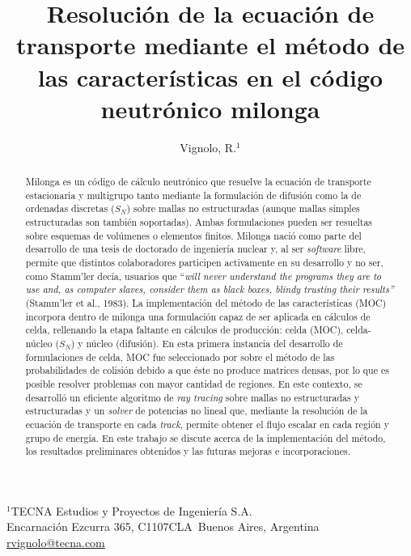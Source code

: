 \documentclass[11pt]{article}
\makeatletter
\def\affiliation#1{\def\@affiliation{#1}}
\def\maketitle{%
\thispagestyle{empty}

\null
\vspace{0.5cm plus 0.5cm minus 0.5cm}

\begin{center}
\begin{minipage}{0.8\linewidth}
\begin{center}
\Large{\textbf{\textsc{\@title}}}

\vspace{0.75cm plus 0.2cm minus 0.1cm}

\large{\@author}

\vspace{1.25cm plus 0.25cm minus 0.25cm}

\small{\@affiliation}
\vspace{1cm plus 0.2cm minus 0.2cm}

\end{center}
\end{minipage}
\end{center}

}
\makeatother
\begin{document}
\title{Resolución de la ecuación de transporte mediante el método de las características en el código neutrónico milonga}
\author{Vignolo, R.$^{1}$}
\affiliation{%
$^1$TECNA Estudios y Proyectos de Ingeniería S.A.\\
Encarnaci\'on Ezcurra 365, C1107CLA~Buenos Aires, Argentina\\
\url{rvignolo@tecna.com}\\
}


\maketitle


\begin{abstract}
\noindent
Milonga es un código de cálculo neutrónico que resuelve la ecuación de transporte estacionaria y multigrupo tanto mediante la formulación de difusión como la de ordenadas discretas ($S_N$) sobre mallas no estructuradas (aunque mallas simples estructuradas son también soportadas). Ambas formulaciones pueden ser resueltas sobre esquemas de volúmenes o elementos finitos. Milonga nació como parte del desarrollo de una tesis de doctorado de ingeniería nuclear y, al ser \emph{software} libre, permite que distintos colaboradores participen activamente en su desarrollo y no ser, como Stamm'ler decía, usuarios que ``\emph{will never understand the programs they are to use and, as computer slaves, consider them as black boxes, blindy trusting their results''} (Stamm'ler et al., 1983). La implementación del método de las características (MOC) incorpora dentro de milonga una formulación capaz de ser aplicada en cálculos de celda, rellenando la etapa faltante en cálculos de producción: celda (MOC), celda-núcleo ($S_N$) y núcleo (difusión). En esta primera instancia del desarrollo de formulaciones de celda, MOC fue seleccionado por sobre el método de las probabilidades de colisión debido a que éste no produce matrices densas, por lo que es posible resolver problemas con mayor cantidad de regiones. En este contexto, se desarrolló un eficiente algoritmo de \emph{ray tracing} sobre mallas no estructuradas y estructuradas y un \emph{solver} de potencias no lineal que, mediante la resolución de la ecuación de transporte en cada \emph{track}, permite obtener el flujo escalar en cada región y grupo de energía. En este trabajo se discute acerca de la implementación del método, los resultados preliminares obtenidos y las futuras mejoras e incorporaciones.
\end{abstract}
\end{document}
